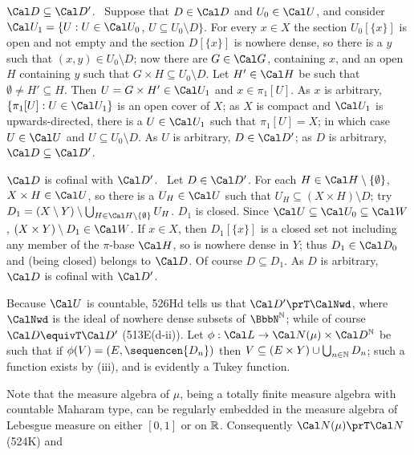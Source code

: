 {

$\Cal D\subseteq\Cal D'$.   \Prf\
Suppose that $D\in\Cal D$ and $U_0\in\Cal U$, and consider
$\Cal U_1=\{U:U\in\Cal U_0$, $U\subseteq U_0\setminus D\}$.   For every
$x\in X$ the section $U_0[\{x\}]$ is open and not empty and the section
$D[\{x\}]$ is
nowhere dense, so there is a $y$ such that $(x,y)\in U_0\setminus D$;
now there are $G\in\Cal G$, containing $x$, and
an open $H$ containing $y$ such that $G\times H\subseteq U_0\setminus D$.
Let $H'\in\Cal H$ be such that $\emptyset\ne H'\subseteq H$.
Then $U=G\times H'\in\Cal U_1$ and $x\in\pi_1[U]$.   As $x$ is arbitrary,
$\{\pi_1[U]:U\in\Cal U_1\}$ is an open cover of $X$;  as $X$ is compact and $\Cal U_1$
is upwards-directed, there is a $U\in\Cal U_1$ such that $\pi_1[U]=X$;  in which case
$U\in\Cal U$ and $U\subseteq U_0\setminus D$.   As $U$ is arbitrary, $D\in\Cal D'$;
as $D$ is arbitrary, $\Cal D\subseteq\Cal D'$.\ \Qed

$\Cal D$ is cofinal with $\Cal D'$.   \Prf\ Let $D\in\Cal D'$.
For each $H\in\Cal H\setminus\{\emptyset\}$, $X\times H\in\Cal U$, so
there is a $U_H\in\Cal U$ such that $U_H\subseteq(X\times H)\setminus D$;
try
$D_1=(X\setminus Y)\setminus\bigcup_{H\in\Cal H\setminus\{\emptyset\}}U_H$.
$D_1$ is closed.   Since $\Cal U\subseteq\Cal U_0\subseteq\Cal W$,
$(X\times Y)\setminus D_1\in\Cal W$.   If $x\in X$, then $D_1[\{x\}]$ is a
closed set not including any member of the $\pi$-base $\Cal H$, so is
nowhere dense in $Y$;  thus $D_1\in\Cal D_0$ and (being closed) belongs to
$\Cal D$.   Of course $D\subseteq D_1$.   As
$D$ is arbitrary, $\Cal D$ is cofinal with $\Cal D'$.\ \Qed

\medskip

 Because $\Cal U$ is countable, 526Hd tells us that
$\Cal D'\prT\CalNwd$, where $\CalNwd$ is the ideal of nowhere dense
subsets of $\NN$;  while of course $\Cal D\equivT\Cal D'$ (513E(d-ii)).
Let $\phi:\Cal L\to\Cal N(\mu)\times\Cal D^{\Bbb N}$ be such that if
$\phi(V)=(E,\sequencen{D_n})$ then
$V\subseteq(E\times Y)\cup\bigcup_{n\in\Bbb N}D_n$;
such a function exists by (iii), and is evidently a Tukey function.

Note that the measure algebra of $\mu$, being a totally finite measure
algebra with countable Maharam type, can be regularly embedded in the
measure algebra of Lebesgue measure on either $[0,1]$ or on $\Bbb R$.
Consequently $\Cal N(\mu)\prT\Cal N$ (524K) and

}
